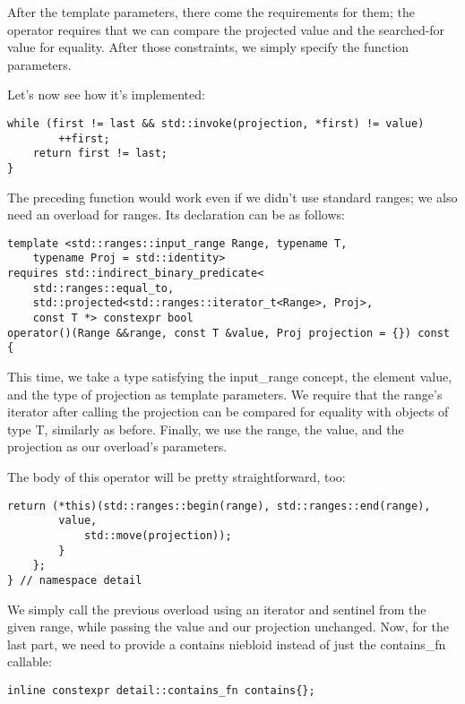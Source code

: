 After the template parameters, there come the requirements for them; the operator requires that we can compare the projected value and the searched-for value for equality. After those constraints, we simply specify the function parameters.

Let's now see how it's implemented:

\begin{lstlisting}[style=styleCXX]
	while (first != last && std::invoke(projection, *first) != value)
		++first;
	return first != last;
}
\end{lstlisting}

The preceding function would work even if we didn't use standard ranges; we also need an overload for ranges. Its declaration can be as follows:

\begin{lstlisting}[style=styleCXX]
template <std::ranges::input_range Range, typename T,
	typename Proj = std::identity>
requires std::indirect_binary_predicate<
	std::ranges::equal_to,
	std::projected<std::ranges::iterator_t<Range>, Proj>,
	const T *> constexpr bool
operator()(Range &&range, const T &value, Proj projection = {}) const {
\end{lstlisting}

This time, we take a type satisfying the input\_range concept, the element value, and the type of projection as template parameters. We require that the range's iterator after calling the projection can be compared for equality with objects of type T, similarly as before. Finally, we use the range, the value, and the projection as our overload's parameters.

The body of this operator will be pretty straightforward, too:

\begin{lstlisting}[style=styleCXX]
		return (*this)(std::ranges::begin(range), std::ranges::end(range),
		value,
			std::move(projection));
		}
	};
} // namespace detail
\end{lstlisting}

We simply call the previous overload using an iterator and sentinel from the given range, while passing the value and our projection unchanged. Now, for the last part, we need to provide a contains niebloid instead of just the contains\_fn callable:

\begin{lstlisting}[style=styleCXX]
inline constexpr detail::contains_fn contains{};
\end{lstlisting}

